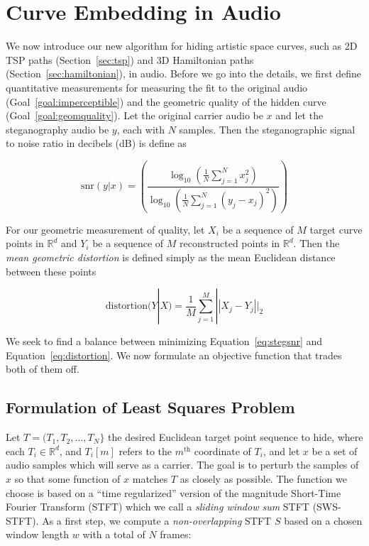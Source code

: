 \documentclass[runningheads]{llncs}
\begin{document}
\section{Curve Embedding in Audio}

We now introduce our new algorithm for hiding artistic space curves, such as 2D TSP paths (Section~\ref{sec:tsp}) and 3D Hamiltonian paths (Section~\ref{sec:hamiltonian}), in audio.  Before we go into the details, we first define quantitative measurements for measuring the fit to the original audio (Goal~\ref{goal:imperceptible}) and the geometric quality of the hidden curve (Goal~\ref{goal:geomquality}).  Let the original carrier audio be $x$ and let the steganography audio be $y$, each with $N$ samples.  Then the steganographic signal to noise ratio in decibels (dB) is define as 

\begin{equation}
  \label{eq:stegsnr}
   \text{snr}(y|x) = \left( \frac{ \log_{10}\left( \frac{1}{N} \sum_{j=1}^N x_j^2 \right) }{ \log_{10}\left( \frac{1}{N} \sum_{j=1}^N (y_j-x_j)^2 \right) } \right)
\end{equation}

For our geometric measurement of quality, let $X_i$ be a sequence of $M$ target curve points in $\mathbb{R}^d$ and $Y_i$ be a sequence of $M$ reconstructed points in $\mathbb{R}^d$.  Then the {\em mean geometric distortion} is defined simply as the mean Euclidean distance between these points 

\begin{equation}
  \label{eq:distortion}
  \text{distortion}(Y|X) = \frac{1}{M} \sum_{j=1}^M ||X_j - Y_j||_2
\end{equation}

We seek to find a balance between minimizing Equation~\ref{eq:stegsnr} and Equation~\ref{eq:distortion}.  We now formulate an objective function that trades both of them off.

\subsection{Formulation of Least Squares Problem}

Let $T = (T_1, T_2, \hdots, T_N \}$ the desired Euclidean target point sequence to hide, where each $T_i \in \mathbb{R}^d$, and $T_i[m]$ refers to the $m^{\text{th}}$ coordinate of $T_i$, and let $x$ be a set of audio samples which will serve as a carrier.  The goal is to perturb the samples of $x$ so that some function of $x$ matches $T$ as closely as possible.  The function we choose is based on a ``time regularized'' version of the magnitude Short-Time Fourier Transform (STFT) which we call a {\em sliding window sum} STFT (SWS-STFT).  As a first step, we compute a {\em non-overlapping} STFT $S$ based on a chosen window length $w$ with a total of $N$ frames:
\end{document}
